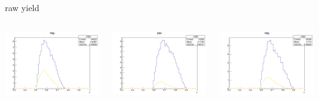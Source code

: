 \begin{frame}{raw yield}
\begin{columns}
\begin{column}[T]{0.25\textwidth}
\includegraphics[width = \textwidth]{results/yield/statistics/yield_x_Q2_z_0.45_4.750_0.60_neg.png}
\end{column}
\begin{column}[T]{0.25\textwidth}
\includegraphics[width = \textwidth]{results/yield/statistics/yield_x_Q2_z_0.45_4.750_0.70_pos.png}
\end{column}
\begin{column}[T]{0.25\textwidth}
\includegraphics[width = \textwidth]{results/yield/statistics/yield_x_Q2_z_0.45_4.750_0.70_neg.png}
\end{column}
\end{columns}
\end{frame}
